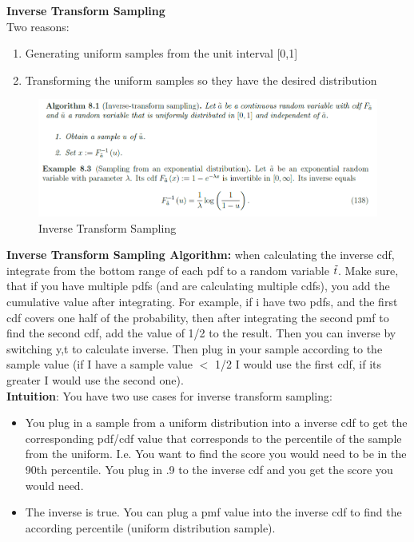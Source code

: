 \documentclass[12pt,twoside]{article}
\begin{document}
\break

\textbf{Inverse Transform Sampling}\\
Two reasons: 
\begin{enumerate}
    \item Generating uniform samples from the unit interval [0,1]
    \item Transforming the uniform samples so they have the desired distribution
\end{enumerate}
    
\begin{figure}[h!]
    \centering
    \includegraphics[scale=.5]{inverse-transform-sampling-exponential.png}
    \caption{Inverse Transform Sampling}
    \label{fig:my_label}
\end{figure}
\textbf{ Inverse Transform Sampling Algorithm:} when calculating the inverse cdf, integrate from the bottom range of each pdf to a random variable $\Tilde{t}$. Make sure, that if you have multiple pdfs (and are calculating multiple cdfs), you add the cumulative value after integrating. For example, if i have two pdfs, and the first cdf covers one half of the probability, then after integrating the second pmf to find the second cdf, add the value of 1/2 to the result. Then you can inverse by switching y,t to calculate inverse. Then plug in your sample according to the sample value (if I have a sample value $<$ 1/2 I would use the first cdf, if its greater I would use the second one). \\

\textbf{Intuition}: You have two use cases for inverse transform sampling:
\begin{itemize}
    \item You plug in a sample from a uniform distribution into a inverse cdf to get the corresponding pdf/cdf value that corresponds to the percentile of the sample from the uniform. I.e. You want to find the score you would need to be in the 90th percentile. You plug in .9 to the inverse cdf and you get the score you would need.
    \item The inverse is true. You can plug a pmf value into the inverse cdf to find the according percentile (uniform distribution sample).
\end{itemize}
\end{document}
